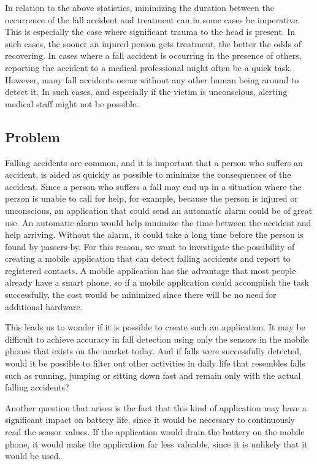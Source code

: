 \documentclass[12pt, a4paper, onecolumn]{article}
\begin{document}
			In relation to the above statistics, minimizing the duration between the occurrence of the fall accident and treatment can in some cases be imperative. This is especially the case where significant trauma to the head is present. In such cases, the sooner an injured person gets treatment, the better the odds of recovering. In cases where a fall accident is occurring in the presence of others, reporting the accident to a medical professional might often be a quick task. However, many fall accidents occur without any other human being around to detect it. In such cases, and especially if the victim is unconscious, alerting medical staff might not be possible.
		
		
		\subsection{Problem}
		
		Falling accidents are common, and it is important that a person who suffers an accident, is aided as quickly as possible to minimize the consequences of the accident. Since a person who suffers a fall may end up in a situation where the person is unable to call for help, for example, because the person is injured or unconscious, an application that could send an automatic alarm could be of great use. An automatic alarm would help minimize the time between the accident and help arriving. Without the alarm, it could take a long time before the person is found by passers-by. For this reason, we want to investigate the possibility of creating a mobile application that can detect falling accidents and report to registered contacts. A mobile application has the advantage that most people already have a smart phone, so if a mobile application could accomplish the task successfully, the cost would be minimized since there will be no need for additional hardware.
		
		This leads us to wonder if it is possible to create such an application. It may be difficult to achieve accuracy in fall detection using only the sensors in the mobile phones that exists on the market today. And if falls were successfully detected, would it be possible to filter out other activities in daily life that resembles falls such as running, jumping or sitting down fast and remain only with the actual falling accidents?
		
		Another question that arises is the fact that this kind of application may have a significant impact on battery life, since it would be necessary to continuously read the sensor values. If the application would drain the battery on the mobile phone, it would make the application far less valuable, since it is unlikely that it would be used.
		
\end{document}
